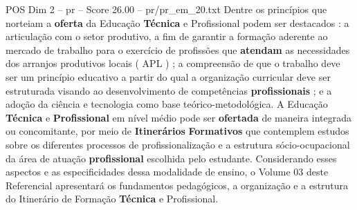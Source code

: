 \begin{textsample}{POS Dim 2 – pr – Score 26.00 – pr/pr\_em\_20.txt}
Dentre os princípios que norteiam a \textbf{oferta} da Educação \textbf{Técnica} e Profissional podem ser destacados : a articulação com o setor produtivo, a fim de garantir a formação aderente ao mercado de trabalho para o exercício de profissões que \textbf{atendam} as necessidades dos arranjos produtivos locais ( APL ) ; a compreensão de que o trabalho deve ser um princípio educativo a partir do qual a organização curricular deve ser estruturada visando ao desenvolvimento de competências \textbf{profissionais} ; e a adoção da ciência e tecnologia como base teórico-metodológica.
A Educação \textbf{Técnica} e \textbf{Profissional} em nível médio pode ser \textbf{ofertada} de maneira integrada ou concomitante, por meio de \textbf{Itinerários} \textbf{Formativos} que contemplem estudos sobre os diferentes processos de profissionalização e a estrutura sócio-ocupacional da área de atuação \textbf{profissional} escolhida pelo estudante.
Considerando esses aspectos e as especificidades dessa modalidade de ensino, o Volume 03 deste Referencial apresentará os fundamentos pedagógicos, a organização e a estrutura do Itinerário de Formação \textbf{Técnica} e Profissional.

\end{textsample}
